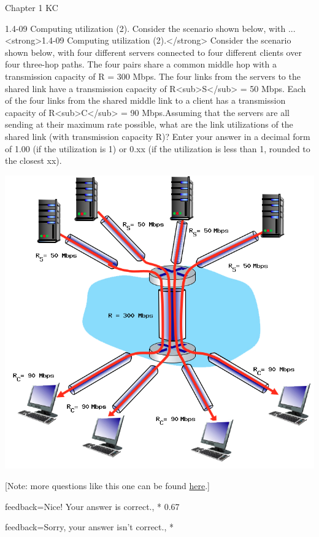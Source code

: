 \documentclass[a4paper]{article}
\begin{document}
\begin{quiz}{Chapter 1 KC}
\begin{shortanswer}[points=1]{1.4-09 Computing utilization (2). Consider the scenario shown below, with ...}
<strong>1.4-09 Computing utilization (2).</strong> Consider the scenario shown below, with four different servers connected to four different clients over four three-hop paths. The four pairs share a common middle hop with a transmission capacity of R = 300 Mbps. The four links from the servers to the shared link have a transmission capacity of R<sub>S</sub> = 50 Mbps. Each of the four links from the shared middle link to a client has a transmission capacity of R<sub>C</sub> = 90 Mbps.Assuming that the servers are all sending at their maximum rate possible, what are the link utilizations of the shared link (with transmission capacity R)? Enter your answer in a decimal form of 1.00 (if the utilization is 1) or 0.xx (if the utilization is less than 1, rounded to the closest xx). 
\begin{center}
\includegraphics[width=\linewidth]{figs/1.4.7.png}
\end{center}
 [Note: more questions like this one can be found \href{http://gaia.cs.umass.edu/kurose_ross/interactive/end-end-throughput-simple.php}{here}.]
\item[feedback={Nice!  Your answer is correct.},]* 0.67
\item[feedback={Sorry, your answer isn't correct.},] *
\end{shortanswer}


\end{quiz}
\end{document}
